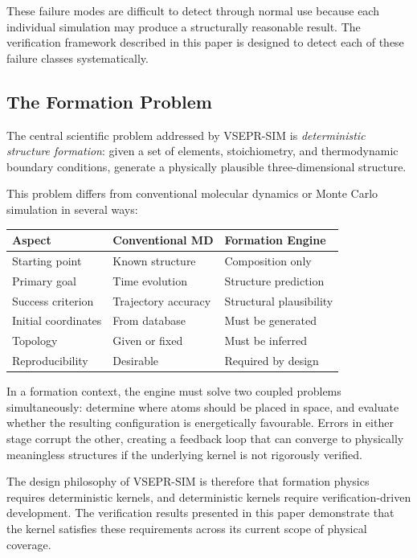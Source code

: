 \documentclass[11pt,twoside]{article}
\begin{document}
These failure modes are difficult to detect through normal use because each individual simulation may produce a structurally reasonable result. The verification framework described in this paper is designed to detect each of these failure classes systematically.

\subsection{The Formation Problem}

The central scientific problem addressed by VSEPR-SIM is \emph{deterministic structure formation}: given a set of elements, stoichiometry, and thermodynamic boundary conditions, generate a physically plausible three-dimensional structure.

This problem differs from conventional molecular dynamics or Monte Carlo simulation in several ways:

\begin{center}
\begin{tabular}{lll}
\toprule
\textbf{Aspect} & \textbf{Conventional MD} & \textbf{Formation Engine} \\
\midrule
Starting point & Known structure & Composition only \\
Primary goal & Time evolution & Structure prediction \\
Success criterion & Trajectory accuracy & Structural plausibility \\
Initial coordinates & From database & Must be generated \\
Topology & Given or fixed & Must be inferred \\
Reproducibility & Desirable & Required by design \\
\bottomrule
\end{tabular}
\end{center}

In a formation context, the engine must solve two coupled problems simultaneously: determine where atoms should be placed in space, and evaluate whether the resulting configuration is energetically favourable. Errors in either stage corrupt the other, creating a feedback loop that can converge to physically meaningless structures if the underlying kernel is not rigorously verified.

The design philosophy of VSEPR-SIM is therefore that formation physics requires deterministic kernels, and deterministic kernels require verification-driven development. The verification results presented in this paper demonstrate that the kernel satisfies these requirements across its current scope of physical coverage.
\end{document}
